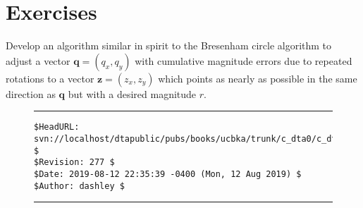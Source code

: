 \section{Exercises}
\label{cdta0:sexe0}

\begin{vworkexercisestatement}
\label{exe:cdta0:sexe0:01}
Develop an algorithm similar in spirit to the Bresenham circle
algorithm to adjust a vector $\mathbf{q} = (q_x, q_y)$ with 
cumulative magnitude errors due to repeated rotations to 
a vector $\mathbf{z} = (z_x, z_y)$ which points as nearly as
possible in the same direction as $\mathbf{q}$ but with 
a desired magnitude $r$.
\end{vworkexercisestatement}
\vworkexercisefooter{}


\vfill
\noindent\begin{figure}[!b]
\noindent\rule[-0.25in]{\textwidth}{1pt}
\begin{tiny}
\begin{verbatim}
$HeadURL: svn://localhost/dtapublic/pubs/books/ucbka/trunk/c_dta0/c_dta0.tex $
$Revision: 277 $
$Date: 2019-08-12 22:35:39 -0400 (Mon, 12 Aug 2019) $
$Author: dashley $
\end{verbatim}
\end{tiny}
\noindent\rule[0.25in]{\textwidth}{1pt}
\end{figure}
%
